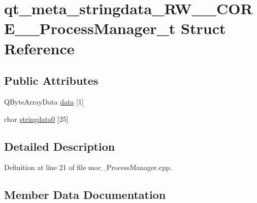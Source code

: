 \hypertarget{structqt__meta__stringdata___r_w_____c_o_r_e_____process_manager__t}{}\section{qt\+\_\+meta\+\_\+stringdata\+\_\+\+R\+W\+\_\+\+\_\+\+C\+O\+R\+E\+\_\+\+\_\+\+Process\+Manager\+\_\+t Struct Reference}
\label{structqt__meta__stringdata___r_w_____c_o_r_e_____process_manager__t}
\subsection*{Public Attributes}
\begin{DoxyCompactItemize}
\item 
Q\+Byte\+Array\+Data \hyperlink{structqt__meta__stringdata___r_w_____c_o_r_e_____process_manager__t_a053b1495564a42f1ca28183ecfa5fb2c}{data} \mbox{[}1\mbox{]}
\item 
char \hyperlink{structqt__meta__stringdata___r_w_____c_o_r_e_____process_manager__t_a2ab1016f5cce35de3db06dd2503c6ead}{stringdata0} \mbox{[}25\mbox{]}
\end{DoxyCompactItemize}


\subsection{Detailed Description}


Definition at line 21 of file moc\+\_\+\+Process\+Manager.\+cpp.



\subsection{Member Data Documentation}
\hypertarget{structqt__meta__stringdata___r_w_____c_o_r_e_____process_manager__t_a053b1495564a42f1ca28183ecfa5fb2c}{}\label{structqt__meta__stringdata___r_w_____c_o_r_e_____process_manager__t_a053b1495564a42f1ca28183ecfa5fb2c} 
